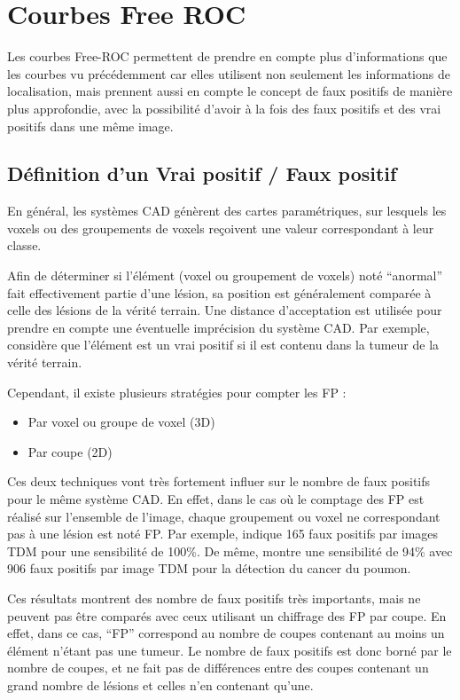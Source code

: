 \section{Courbes Free ROC}	

Les courbes Free-ROC permettent de prendre en compte plus d'informations que les courbes vu précédemment car elles utilisent non seulement les informations de localisation, mais prennent aussi en compte le concept de faux positifs de manière plus approfondie, avec la possibilité d'avoir à la fois des faux positifs et des vrai positifs dans une même image.

\subsection{Définition d'un Vrai positif / Faux positif}

En général, les systèmes CAD génèrent des cartes paramétriques, sur lesquels les voxels ou des groupements de voxels reçoivent une valeur correspondant à leur classe. 

Afin de déterminer si l'élément (voxel ou groupement de voxels) noté ``anormal'' fait effectivement partie d'une lésion, sa  position est généralement comparée à celle des lésions de la vérité terrain. Une distance d'acceptation est utilisée pour prendre en compte une éventuelle imprécision du système CAD. Par exemple, \cite{paik2004surface} considère que l'élément est un vrai positif si il est contenu dans la tumeur de la vérité terrain.

Cependant, il existe plusieurs stratégies pour compter les FP :
\begin{itemize}
 \item Par voxel ou groupe de voxel (3D)
 \item Par coupe (2D)
\end{itemize}

Ces deux techniques vont très fortement influer sur le nombre de faux positifs pour le même système CAD. En effet, dans le cas où le comptage des FP est réalisé sur l'ensemble de l'image, chaque groupement ou voxel ne correspondant pas à une lésion est noté FP. Par exemple, \cite{paik2004surface} indique 165 faux positifs par images TDM pour une sensibilité de 100\%. De même, \cite{zhao2003automatic} montre une sensibilité de 94\% avec 906 faux positifs par image TDM pour la détection du cancer du poumon.  

Ces résultats montrent des nombre de faux positifs très importants, mais ne peuvent pas être comparés avec ceux utilisant un chiffrage des FP par coupe. En effet, dans ce cas, ``FP'' correspond au nombre de coupes contenant au moins un élément n'étant pas une tumeur. Le nombre de faux positifs est donc borné par le nombre de coupes, et ne fait pas de différences entre des coupes contenant un grand nombre de lésions et celles n'en contenant qu'une. 


